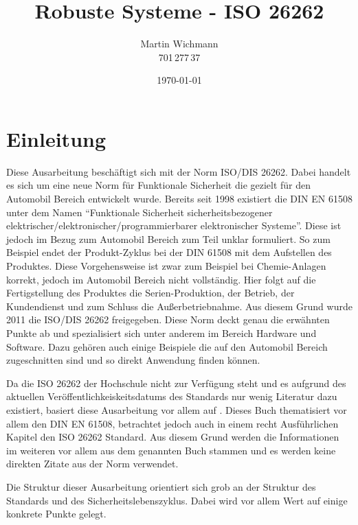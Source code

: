 \documentclass[a4paper,DIV=calc,ngerman]{scrartcl}
\begin{document}
\titlehead{}
\title{Robuste Systeme - ISO 26262}
\author{Martin Wichmann\\701\,277\,37}
\date{\today}
\maketitle

\tableofcontents


\section{Einleitung}
\label{sec:Einleitung}
Diese Ausarbeitung beschäftigt sich mit der Norm ISO/DIS 26262. Dabei handelt es sich um eine neue Norm für Funktionale Sicherheit die gezielt für den Automobil Bereich entwickelt wurde. Bereits seit 1998 existiert die DIN EN 61508 unter dem Namen "`Funktionale Sicherheit sicherheitsbezogener elektrischer/elektronischer/programmierbarer elektronischer Systeme"'. Diese ist jedoch im Bezug zum Automobil Bereich zum Teil unklar formuliert. So zum Beispiel endet der Produkt-Zyklus bei der DIN 61508 mit dem Aufstellen des Produktes. Diese Vorgehensweise ist zwar zum Beispiel bei Chemie-Anlagen korrekt, jedoch im Automobil Bereich nicht vollständig. Hier folgt auf die Fertigstellung des Produktes die Serien-Produktion, der Betrieb, der Kundendienst und zum Schluss die Außerbetriebnahme. Aus diesem Grund wurde 2011 die ISO/DIS 26262 freigegeben. Diese Norm deckt genau die erwähnten Punkte ab und spezialisiert sich unter anderem im Bereich Hardware und Software. Dazu gehören auch einige Beispiele die auf den Automobil Bereich zugeschnitten sind und so direkt Anwendung finden können.

Da die ISO 26262 der Hochschule nicht zur Verfügung steht und es aufgrund des aktuellen Veröffentlichkeiskeitsdatums des Standards nur wenig Literatur dazu existiert, basiert diese Ausarbeitung vor allem auf \cite{1}. Dieses Buch thematisiert vor allem den DIN EN 61508, betrachtet jedoch auch in einem recht Ausführlichen Kapitel den ISO 26262 Standard. Aus diesem Grund werden die Informationen im weiteren vor allem aus dem genannten Buch stammen und es werden keine direkten Zitate aus der Norm verwendet.

Die Struktur dieser Ausarbeitung orientiert sich grob an der Struktur des Standards und des Sicherheitslebenszyklus. Dabei wird vor allem Wert auf einige konkrete Punkte gelegt.
\end{document}
